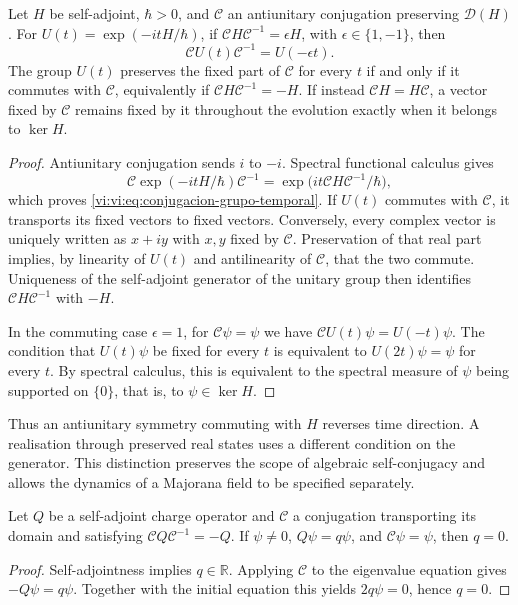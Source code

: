 \begin{proposition}
\label{vi:vi:prop:conjugacion-evolucion}
Let $H$ be self-adjoint, $\hbar>0$, and $\mathcal C$ an antiunitary
conjugation preserving $\mathcal D(H)$. For
$U(t)=\exp(-itH/\hbar)$, if
$\mathcal C H\mathcal C^{-1}=\epsilon H$, with
$\epsilon\in\{1,-1\}$, then
\begin{equation}
 \mathcal C U(t)\mathcal C^{-1}=U(-\epsilon t).
 \label{vi:vi:eq:conjugacion-grupo-temporal}
\end{equation}
The group $U(t)$ preserves the fixed part of $\mathcal C$ for every $t$
if and only if it commutes with $\mathcal C$, equivalently if
$\mathcal C H\mathcal C^{-1}=-H$.
If instead $\mathcal C H=H\mathcal C$, a vector fixed by
$\mathcal C$ remains fixed by it throughout the evolution
exactly when it belongs to $\ker H$.
\end{proposition}
\begin{proof}
Antiunitary conjugation sends $i$ to $-i$. Spectral functional
calculus gives
\[
 \mathcal C\exp(-itH/\hbar)\mathcal C^{-1}
 =\exp\bigl(it\mathcal C H\mathcal C^{-1}/\hbar\bigr),
\]
which proves \eqref{vi:vi:eq:conjugacion-grupo-temporal}. If $U(t)$ commutes
with $\mathcal C$, it transports its fixed vectors to fixed vectors.
Conversely, every complex vector is uniquely written as
$x+iy$ with $x,y$ fixed by $\mathcal C$. Preservation of that real
part implies, by linearity of $U(t)$ and antilinearity of
$\mathcal C$, that the two commute. Uniqueness of the self-adjoint
generator of the unitary group then identifies
$\mathcal C H\mathcal C^{-1}$ with $-H$.

In the commuting case $\epsilon=1$, for $\mathcal C\psi=\psi$
we have $\mathcal C U(t)\psi=U(-t)\psi$. The condition that $U(t)\psi$ be fixed
for every $t$ is equivalent to $U(2t)\psi=\psi$ for every $t$. By
spectral calculus, this is equivalent to the spectral measure of $\psi$
being supported on $\{0\}$, that is, to $\psi\in\ker H$.
\end{proof}

Thus an antiunitary symmetry commuting with $H$ reverses time
direction. A realisation through preserved real states uses
a different condition on the generator. This distinction preserves the scope
of algebraic self-conjugacy and allows the dynamics of a Majorana
field to be specified separately.

\begin{proposition}
\label{vi:vi:prop:carga-real}
Let $Q$ be a self-adjoint charge operator and $\mathcal C$ a
conjugation transporting its domain and satisfying
$\mathcal C Q\mathcal C^{-1}=-Q$. If $\psi\ne0$,
$Q\psi=q\psi$, and $\mathcal C\psi=\psi$, then $q=0$.
\end{proposition}
\begin{proof}
Self-adjointness implies $q\in\mathbb R$. Applying $\mathcal C$
to the eigenvalue equation gives $-Q\psi=q\psi$. Together with the initial equation
this yields $2q\psi=0$, hence $q=0$.
\end{proof}

